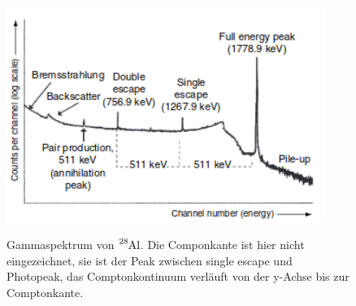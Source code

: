 \begin{figure}
  \centering
  \includegraphics[height=7cm]{Spektrum.png}
  \caption{Gammaspektrum von $\ce{^{28}Al}$. Die Componkante ist hier nicht eingezeichnet, sie ist der Peak zwischen single escape und Photopeak,
  das Comptonkontinuum verläuft von der y-Achse bis zur Comptonkante.}\cite{Gilmore2}
  \label{fig:Spektrum}
\end{figure}
